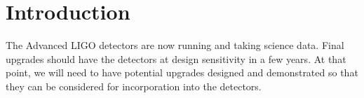 \section{Introduction}

%
%


%
The Advanced LIGO detectors are now running and taking science data. Final upgrades should have the detectors at design sensitivity in a few years. At that point, we will need to have potential upgrades designed and demonstrated so that they can be considered for incorporation into the detectors.


